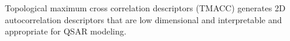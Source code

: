 Topological maximum cross correlation descriptors (TMACC) \cite{Melville_2007} generates 2D autocorrelation descriptors that are low dimensional and interpretable and appropriate for QSAR modeling.